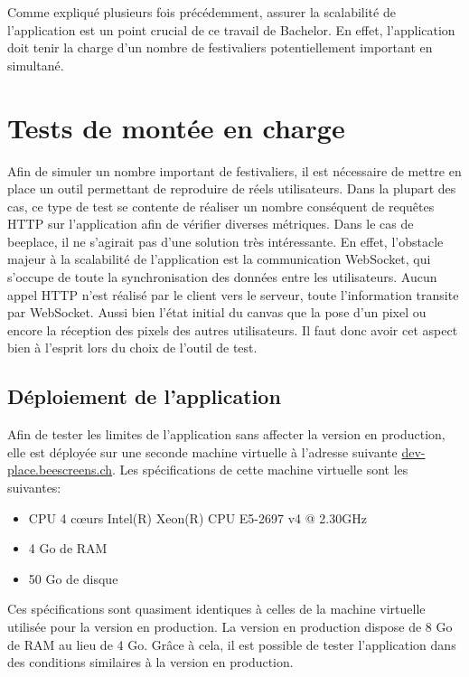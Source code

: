 Comme expliqué plusieurs fois précédemment, assurer la scalabilité de l'application est un point crucial de ce travail de Bachelor. En effet, l'application doit tenir la charge d'un nombre de festivaliers potentiellement important en simultané.

\section{Tests de montée en charge}

Afin de simuler un nombre important de festivaliers, il est nécessaire de mettre en place un outil permettant de reproduire de réels utilisateurs. Dans la plupart des cas, ce type de test se contente de réaliser un nombre conséquent de requêtes HTTP sur l'application afin de vérifier diverses métriques. Dans le cas de \gls{beeplace}, il ne s'agirait pas d'une solution très intéressante. En effet, l'obstacle majeur à la scalabilité de l'application est la communication WebSocket, qui s'occupe de toute la synchronisation des données entre les utilisateurs. Aucun appel HTTP n'est réalisé par le client vers le serveur, toute l'information transite par WebSocket. Aussi bien l'état initial du canvas que la pose d'un pixel ou encore la réception des pixels des autres utilisateurs. Il faut donc avoir cet aspect bien à l'esprit lors du choix de l'outil de test.

\subsection{Déploiement de l'application}

Afin de tester les limites de l'application sans affecter la version en production, elle est déployée sur une seconde machine virtuelle à l'adresse suivante \href{https://dev-place.beescreens.ch}{dev-place.beescreens.ch}. Les spécifications de cette machine virtuelle sont les suivantes:

\begin{itemize}
  \item CPU 4 c\oe{}urs Intel(R) Xeon(R) CPU E5-2697 v4 @ 2.30GHz
  \item 4 Go de RAM
  \item 50 Go de disque
\end{itemize}

Ces spécifications sont quasiment identiques à celles de la machine virtuelle utilisée pour la version en production. La version en production dispose de 8 Go de RAM au lieu de 4 Go. Grâce à cela, il est possible de tester l'application dans des conditions similaires à la version en production.

